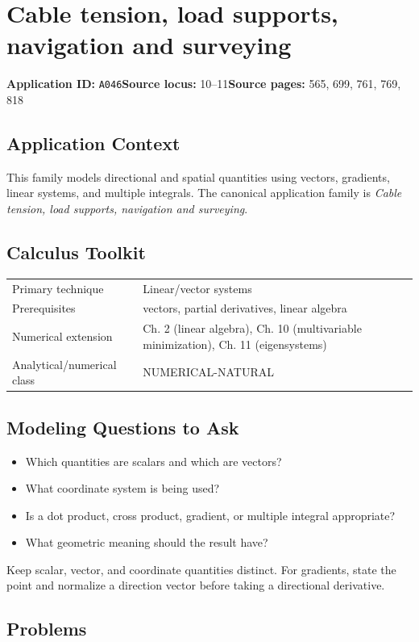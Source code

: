 \documentclass[11pt]{book}
\newcommand{\pid}[1]{\texttt{#1}}
\begin{document}
\chapter{Cable tension, load supports, navigation and surveying}\label{app:A046}
\textbf{Application ID:} \pid{A046}\quad \textbf{Source locus:} 10–11\quad \textbf{Source pages:} 565, 699, 761, 769, 818
\section*{Application Context}
This family models directional and spatial quantities using vectors, gradients, linear systems, and multiple integrals. The canonical application family is \emph{Cable tension, load supports, navigation and surveying}.
\section*{Calculus Toolkit}
\begin{tabularx}{\textwidth}{@{}lX@{}}\toprule
Primary technique & Linear/vector systems \\
Prerequisites & vectors, partial derivatives, linear algebra \\
Numerical extension & Ch. 2 (linear algebra), Ch. 10 (multivariable minimization), Ch. 11 (eigensystems) \\
Analytical/numerical class & NUMERICAL-NATURAL \\
\bottomrule\end{tabularx}
\section*{Modeling Questions to Ask}\begin{itemize}
\item Which quantities are scalars and which are vectors?
\item What coordinate system is being used?
\item Is a dot product, cross product, gradient, or multiple integral appropriate?
\item What geometric meaning should the result have?
\end{itemize}
\begin{errorbox}Keep scalar, vector, and coordinate quantities distinct. For gradients, state the point and normalize a direction vector before taking a directional derivative.\end{errorbox}
\section*{Problems}
\end{document}
